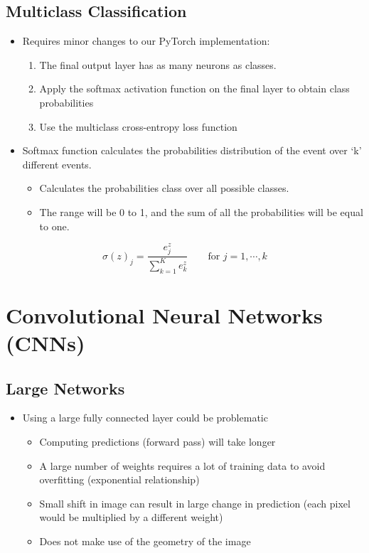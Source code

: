 \documentclass[11pt]{article}
\begin{document}
\subsection{Multiclass Classification}
\begin{itemize}
\item Requires minor changes to our PyTorch implementation:
\begin{enumerate}
\item The final output layer has as many neurons as classes.
\item Apply the softmax activation function on the final layer to obtain class probabilities
\item Use the multiclass cross-entropy loss function
\end{enumerate}
\item Softmax function calculates the probabilities distribution of the event over ‘k’ different events.
\begin{itemize}
\item Calculates the probabilities class over all possible classes.
\item The range will be 0 to 1, and the sum of all the probabilities will be equal to one.
\end{itemize}
\end{itemize}
$$ \sigma (z) _j = \frac{e^z_j}{\sum_{k=1}^K e^z_k} \quad \quad \text{for        } j = 1, \cdots, k$$

\pagebreak



\section{Convolutional Neural Networks (CNNs)}

\subsection{Large Networks}
\begin{itemize}
\item Using a large fully connected layer could be problematic
\begin{itemize}

\item Computing predictions (forward pass) will take longer
\item A large number of weights requires a lot of training data to avoid overfitting (exponential relationship)
\item Small shift in image can result in large change in prediction (each pixel would be multiplied by a different weight)
\item Does not make use of the geometry of the image
\end{itemize}
\end{itemize}
\end{document}
